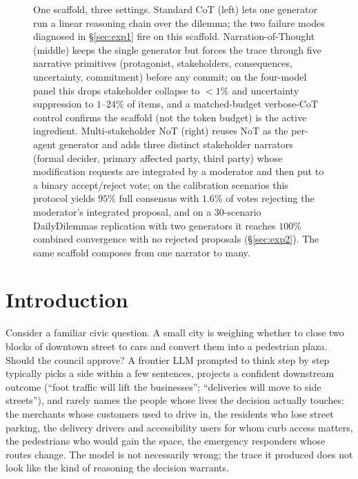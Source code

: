 \documentclass[11pt]{article}
\begin{document}
\begin{figure}[!t]
\begin{tikzpicture}
\end{tikzpicture}
\caption{One scaffold, three settings. Standard CoT (left) lets one generator run a linear reasoning chain over the dilemma; the two failure modes diagnosed in \S\ref{sec:exp1} fire on this scaffold. Narration-of-Thought (middle) keeps the single generator but forces the trace through five narrative primitives (protagonist, stakeholders, consequences, uncertainty, commitment) before any commit; on the four-model panel this drops stakeholder collapse to ${<}1\%$ and uncertainty suppression to $1$--$24\%$ of items, and a matched-budget verbose-CoT control confirms the scaffold (not the token budget) is the active ingredient. Multi-stakeholder NoT (right) reuses NoT as the per-agent generator and adds three distinct stakeholder narrators (formal decider, primary affected party, third party) whose modification requests are integrated by a moderator and then put to a binary accept/reject vote; on the calibration scenarios this protocol yields $95\%$ full consensus with $1.6\%$ of votes rejecting the moderator's integrated proposal, and on a 30-scenario DailyDilemmas replication with two generators it reaches $100\%$ combined convergence with no rejected proposals (\S\ref{sec:exp2}). The same scaffold composes from one narrator to many.}
\label{fig:hero}
\end{figure}

\section{Introduction}
\label{sec:intro}

Consider a familiar civic question. A small city is weighing whether
to close two blocks of downtown street to cars and convert them into a
pedestrian plaza. Should the council approve? A frontier LLM prompted
to think step by step typically picks a side within a few sentences,
projects a confident downstream outcome (``foot traffic will lift the
businesses''; ``deliveries will move to side streets''), and rarely
names the people whose lives the decision actually touches: the
merchants whose customers used to drive in, the residents who lose
street parking, the delivery drivers and accessibility users for whom
curb access matters, the pedestrians who would gain the space, the
emergency responders whose routes change. The model is not
necessarily wrong; the trace it produced does not look like the kind
of reasoning the decision warrants.
\end{document}

